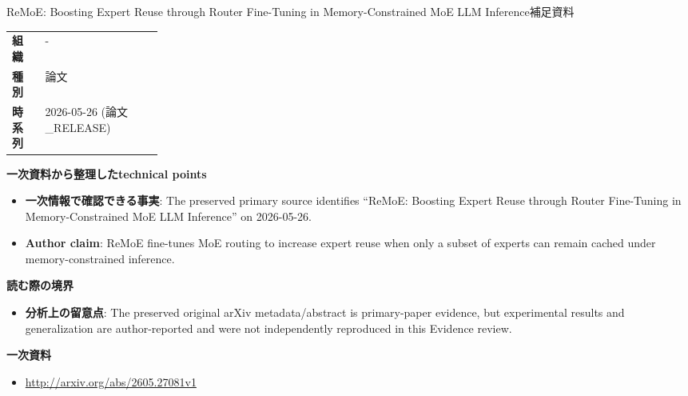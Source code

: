\begin{technicalnote}{ReMoE: Boosting Expert Reuse through Router Fine-Tuning in Memory-Constrained MoE LLM Inference}{補足資料}
\begin{tabularx}{\linewidth}{@{}>{\bfseries}p{0.22\linewidth}X@{}}
組織 & - \\
種別 & 論文 \\
時系列 & 2026-05-26 (論文\_RELEASE) \\
\end{tabularx}
\smallskip
{\bfseries 一次資料から整理したtechnical points}
\begin{itemize}[leftmargin=1.5em,itemsep=0.35em]
\item \textbf{一次情報で確認できる事実}: The preserved primary source identifies “ReMoE: Boosting Expert Reuse through Router Fine-Tuning in Memory-Constrained MoE LLM Inference” on 2026-05-26.
\item \textbf{Author claim}: ReMoE fine-tunes MoE routing to increase expert reuse when only a subset of experts can remain cached under memory-constrained inference.
\end{itemize}
{\bfseries 読む際の境界}
\begin{itemize}[leftmargin=1.5em,itemsep=0.35em]
\item \textbf{分析上の留意点}: The preserved original arXiv metadata/abstract is primary-paper evidence, but experimental results and generalization are author-reported and were not independently reproduced in this Evidence review.
\end{itemize}
{\bfseries 一次資料}
\begingroup\sloppy
\begin{itemize}[leftmargin=1.5em,itemsep=0.25em]
\item {\scriptsize\url{http://arxiv.org/abs/2605.27081v1}}
\end{itemize}
\endgroup
\end{technicalnote}
\medskip
